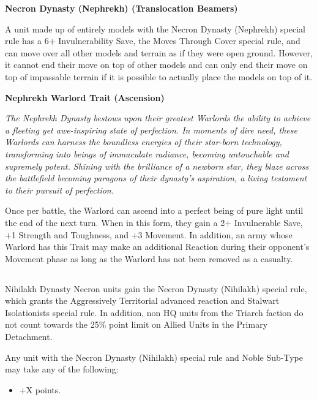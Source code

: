 \begin{multicols}{2}
	\textbf{Necron Dynasty (Nephrekh) (Translocation Beamers)} 
	
	A unit made up of entirely models with the Necron Dynasty (Nephrekh) special rule has a 6+ Invulnerability Save, the Moves Through Cover special rule, and can move over all other models and terrain as if they were open ground. However, it cannot end their move on top of other models and can only end their move on top of impassable terrain if it is possible to actually place the models on top of it.
	
	\textbf{Nephrekh Warlord Trait (Ascension)}
	
	\textit{The Nephrekh Dynasty bestows upon their greatest Warlords the ability to achieve a fleeting yet awe-inspiring state of perfection. In moments of dire need, these Warlords can harness the boundless energies of their star-born technology, transforming into beings of immaculate radiance, becoming untouchable and supremely potent. Shining with the brilliance of a newborn star, they blaze across the battlefield becoming paragons of their dynasty’s aspiration, a living testament to their pursuit of perfection.}
	
	Once per battle, the Warlord can ascend into a perfect being of pure light until the end of the next turn. When in this form, they gain a 2+ Invulnerable Save, +1 Strength and Toughness, and +3 Movement. In addition, an army whose Warlord has this Trait may make an additional Reaction during their opponent’s Movement phase as long as the Warlord has not been removed as a casualty.
\end{multicols}


\newpage
\subsection[Nihilakh]{}

Nihilakh Dynasty Necron units gain the Necron Dynasty (Nihilakh) special rule, which grants the Aggressively Territorial advanced reaction and Stalwart Isolationists special rule. In addition, non HQ units from the Triarch faction do not count towards the 25\% point limit on Allied Units in the Primary Detachment.

Any unit with the Necron Dynasty (Nihilakh) special rule and Noble Sub-Type may take any of the following:
\begin{itemize}
	\item {} \dotfill +X points.
\end{itemize}

